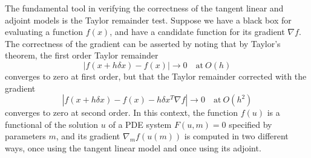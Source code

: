 \documentclass{siamltex}
\begin{document}
The fundamental tool in verifying the correctness of the tangent linear and adjoint
models is the Taylor remainder test. Suppose we have a black box for evaluating a function $f(x)$,
and have a candidate function for its gradient $\nabla f$. The correctness of the gradient can
be asserted by noting that by Taylor's theorem, the first order Taylor remainder
\begin{equation}
  \left| f(x + h \delta x) - f(x) \right| \rightarrow 0 \quad \textrm{at} \  O(h)
\end{equation}
converges to zero at first order, but that the Taylor remainder corrected with the gradient
\begin{equation} \label{eq:taylor_2nd}
  \left| f(x + h \delta x) - f(x) - h\delta x^T \nabla f \right| \rightarrow 0 \quad \textrm{at} \  O(h^2)
\end{equation}
converges to zero at second order. In this context, the function $f(u)$ is a functional of the solution $u$
of a PDE system $F(u,m) = 0$ specified by parameters $m$, and its gradient $\nabla_m f(u(m))$ is computed in two different ways, once using the tangent linear model
and once using its adjoint.
\end{document}
